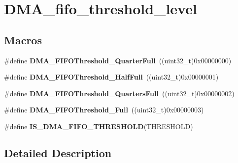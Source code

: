 \hypertarget{group___d_m_a__fifo__threshold__level}{}\section{D\+M\+A\+\_\+fifo\+\_\+threshold\+\_\+level}
\label{group___d_m_a__fifo__threshold__level}
\subsection*{Macros}
\begin{DoxyCompactItemize}
\item 
\hypertarget{group___d_m_a__fifo__threshold__level_gacc98384bbba43a9c4f70b448518acfe4}{}\#define {\bfseries D\+M\+A\+\_\+\+F\+I\+F\+O\+Threshold\+\_\+Quarter\+Full}~((uint32\+\_\+t)0x00000000)\label{group___d_m_a__fifo__threshold__level_gacc98384bbba43a9c4f70b448518acfe4}

\item 
\hypertarget{group___d_m_a__fifo__threshold__level_ga626b546865960343fdcfdf33ac8ceb03}{}\#define {\bfseries D\+M\+A\+\_\+\+F\+I\+F\+O\+Threshold\+\_\+\+Half\+Full}~((uint32\+\_\+t)0x00000001)\label{group___d_m_a__fifo__threshold__level_ga626b546865960343fdcfdf33ac8ceb03}

\item 
\hypertarget{group___d_m_a__fifo__threshold__level_ga6f041008fce4bb341f9a518d803a308b}{}\#define {\bfseries D\+M\+A\+\_\+\+F\+I\+F\+O\+Threshold\+\_\+Quarters\+Full}~((uint32\+\_\+t)0x00000002)\label{group___d_m_a__fifo__threshold__level_ga6f041008fce4bb341f9a518d803a308b}

\item 
\hypertarget{group___d_m_a__fifo__threshold__level_ga9f1008e0df7d41d910ed89d7e0872e69}{}\#define {\bfseries D\+M\+A\+\_\+\+F\+I\+F\+O\+Threshold\+\_\+\+Full}~((uint32\+\_\+t)0x00000003)\label{group___d_m_a__fifo__threshold__level_ga9f1008e0df7d41d910ed89d7e0872e69}

\item 
\#define {\bfseries I\+S\+\_\+\+D\+M\+A\+\_\+\+F\+I\+F\+O\+\_\+\+T\+H\+R\+E\+S\+H\+O\+L\+D}(T\+H\+R\+E\+S\+H\+O\+L\+D)
\end{DoxyCompactItemize}


\subsection{Detailed Description}


